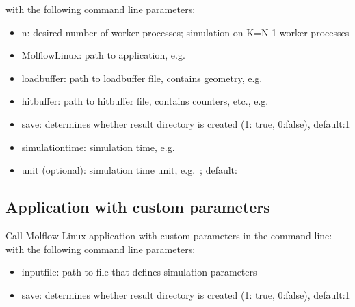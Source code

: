 \smallskip
with the following command line parameters:
\begin{itemize}[noitemsep,topsep=0pt]
\item n: desired number of worker processes; simulation on K=N-1 worker processes
\item MolflowLinux: path to application, e.g.\ 
\item loadbuffer: path to loadbuffer file, contains geometry, e.g.\ 
\item hitbuffer: path to hitbuffer file, contains counters, etc., e.g.\ 
\item save: determines whether result directory is created (1: true, 0:false), default:1
\item simulationtime: simulation time, e.g.\ 
\item unit (optional): simulation time unit, e.g.\ ; default: 
\end{itemize}

\subsection{Application with custom parameters}
Call Molflow Linux application with custom parameters in the command line:
\smallskip
with the following command line parameters:
\begin{itemize}[noitemsep,topsep=0pt]
\item inputfile: path to file that defines simulation parameters
\item save: determines whether result directory is created (1: true, 0:false), default:1
\end{itemize}
\bigskip


